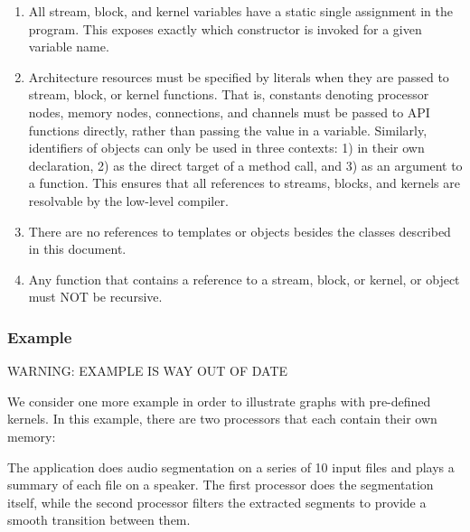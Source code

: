 \begin{enumerate}

\item All stream, block, and kernel variables have a static
single assignment in the program.  This exposes exactly which
constructor is invoked for a given variable name.

\item Architecture resources must be specified by literals when they
are passed to stream, block, or kernel functions.  That is,
constants denoting processor nodes, memory nodes, connections, and
channels must be passed to API functions directly, rather than passing
the value in a variable.  Similarly, identifiers of objects can only
be used in three contexts: 1) in their own declaration, 2) as the
direct target of a method call, and 3) as an argument to a function.
This ensures that all references to streams, blocks, and kernels are
resolvable by the low-level compiler.

\item There are no references to templates or objects besides the
classes described in this document.

\item Any function that contains a reference to a stream, block, or kernel, or
object must NOT be recursive.

\end{enumerate}

\subsubsection{Example}
\label{sec:example}

WARNING: EXAMPLE IS WAY OUT OF DATE

We consider one more example in order to illustrate graphs with
pre-defined kernels.  In this example, there are two processors that
each contain their own memory:

\begin{figure}[h]
\begin{center}
\end{center}
\vspace{-12pt}
\end{figure}

The application does audio segmentation on a series of 10 input files
and plays a summary of each file on a speaker.  The first processor
does the segmentation itself, while the second processor filters the
extracted segments to provide a smooth transition between them.


